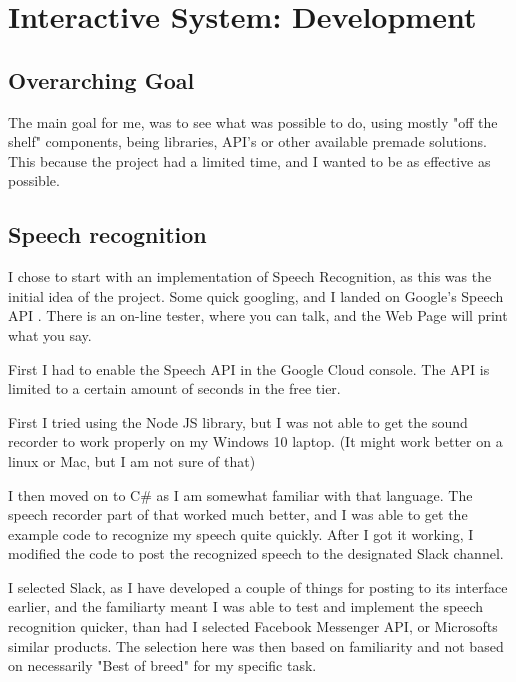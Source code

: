 \documentclass[11pt,fleqn]{book} %
\begin{document}

\chapter{Interactive System: Development}
\section{Overarching Goal}
The main goal for me, was to see what was possible to do, using mostly "off the shelf" components, being libraries, API's or other available premade solutions. This because the project had a limited time, and I wanted to be as effective as possible.
\section{Speech recognition}
I chose to start with an implementation of Speech Recognition, as this was the initial idea of the project.
Some quick googling, and I landed on Google's Speech API \cite{GoogleCloudPlatformSpeechPlatform}. There is an on-line tester, where you can talk, and the Web Page will print what you say.

First I had to enable the Speech API in the Google Cloud console. The API is limited to a certain amount of seconds in the free tier.

First I tried using the Node JS library, but I was not able to get the sound recorder to work properly on my Windows 10 laptop. (It might work better on a linux or Mac, but I am not sure of that)

I then moved on to C\# as I am somewhat familiar with that language. The speech recorder part of that worked much better, and I was able to get the example code to recognize my speech quite quickly.
After I got it working, I modified the code to post the recognized speech to the designated Slack channel.

I selected Slack, as I have developed a couple of things for posting to its interface earlier, and the familiarty meant I was able to test and implement the speech recognition quicker, than had I selected Facebook Messenger API, or Microsofts similar products.
The selection here was then based on familiarity and not based on necessarily "Best of breed" for my specific task.
\end{document}
